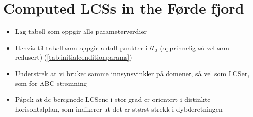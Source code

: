 \section{Computed LCSs in the Førde fjord}
\label{sec:computed_lcss_in_the_forde_fjord}

\begin{framed}
    \begin{itemize}
        \item Lag tabell som oppgir alle parameterverdier
        \item Henvis til tabell som oppgir antall punkter i $\mathcal{U}_{0}$ (opprinnelig så vel som redusert) (\cref{tab:initialconditionparams})
        \item Understrek at vi bruker samme innsynsvinkler på domener,
            så vel som LCSer, som for ABC-strømning
        \item Påpek at de beregnede LCSene i stor grad er orientert
            i distinkte horisontalplan, som indikerer at det er
            størst strekk i dybderetningen
    \end{itemize}
\end{framed}



